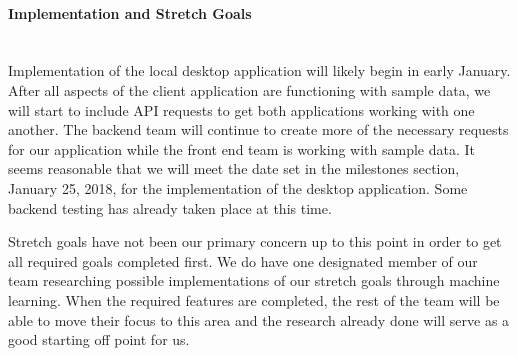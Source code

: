\paragraph{Implementation and Stretch Goals} \mbox{}\\[\paragraphheaderspace]
Implementation of the local desktop application will likely begin in early January. After all aspects of the client application are functioning with sample data, we will start to include API requests to get both applications working with one another. The backend team will continue to create more of the necessary requests for our application while the front end team is working with sample data. It seems reasonable that we will meet the date set in the milestones section, January 25, 2018, for the implementation of the desktop application. Some backend testing has already taken place at this time.\par
Stretch goals have not been our primary concern up to this point in order to get all required goals completed first. We do have one designated member of our team researching possible implementations of our stretch goals through machine learning. When the required features are completed, the rest of the team will be able to move their focus to this area and the research already done will serve as a good starting off point for us.\par 